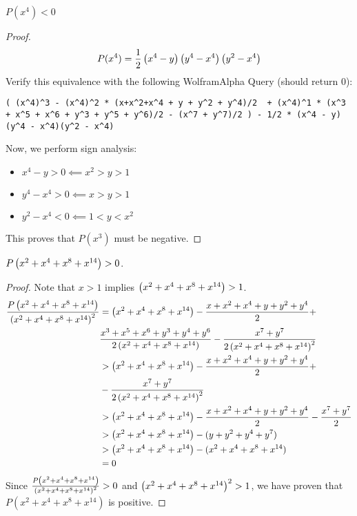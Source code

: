 \documentclass[10pt]{../usamts}
\begin{document}
\begin{solution}
\begin{claim}
    $P(x^4) < 0$
    \label{claim:px4}
\end{claim}
\begin{proof}
    $$P(x^4) = \frac{1}{2} \left( x^4-y \right) \left( y^4 - x^4 \right)\left( y^2 - x^4 \right)$$ 
    Verify this equivalence with the following WolframAlpha Query (should return $0$): 
\begin{lstlisting}
( (x^4)^3 - (x^4)^2 * (x+x^2+x^4 + y + y^2 + y^4)/2  + (x^4)^1 * (x^3 + x^5 + x^6 + y^3 + y^5 + y^6)/2 - (x^7 + y^7)/2 ) - 1/2 * (x^4 - y)(y^4 - x^4)(y^2 - x^4)
\end{lstlisting}
    Now, we perform sign analysis:
    \begin{itemize}
        \item $x^4 - y > 0 \impliedby x^2 > y > 1$
        \item $y^4 - x^4 > 0 \impliedby x > y > 1$
        \item $y^2 - x^4 < 0 \impliedby 1 < y < x^2$
    \end{itemize}
    This proves that $P(x^3)$ must be negative.
\end{proof}

\newcommand{\zeesub}{\paren{x^2 + x^4 + x^8 + x^{14}}}
\begin{claim}
    $P\zeesub > 0$.
    \label{claim:pinfty}
\end{claim}
\begin{proof}
    Note that $x > 1$ implies $\zeesub > 1$.
    \begin{align*}
        \frac{P\zeesub}{\zeesub^2}  &= \zeesub - \frac{x+x^2+x^4+y+y^2+y^4}{2} +\\ 
                        & \frac{x^3 + x^5 + x^6 + y^3 + y^4 + y^6}{2\zeesub}- \frac{x^7+y^7}{2\zeesub^2} \\
                  &> \zeesub - \frac{x+x^2+x^4+y+y^2+y^4}{2} + \\
                  &- \frac{x^7+y^7}{2\zeesub^2} \\
                  &> \zeesub - \frac{x+x^2+x^4+y+y^2+y^4}{2} - \frac{x^7+y^7}{2} \\
                  &> \zeesub - (y + y^2 + y^4 + y^7) \\
                  &> \zeesub - (x^2 + x^4 + x^8 + x^{14})\\
                  &= 0
    \end{align*}
    Since $\frac{P\zeesub}{\zeesub^2} > 0$ and $\zeesub^2 > 1$, we have proven that $P(x^2 + x^4 + x^8 + x^{14})$ is positive.
\end{proof}


\end{solution}
\end{document}
